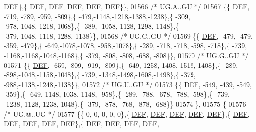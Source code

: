\begin{DoxyCode}
      \mbox{\hyperlink{1_88_84__epars_8h_a397419fc12b37ed479c8abb9d444d843}{DEF}}\},\{  \mbox{\hyperlink{1_88_84__epars_8h_a397419fc12b37ed479c8abb9d444d843}{DEF}},  \mbox{\hyperlink{1_88_84__epars_8h_a397419fc12b37ed479c8abb9d444d843}{DEF}},  \mbox{\hyperlink{1_88_84__epars_8h_a397419fc12b37ed479c8abb9d444d843}{DEF}},  \mbox{\hyperlink{1_88_84__epars_8h_a397419fc12b37ed479c8abb9d444d843}{DEF}},  \mbox{\hyperlink{1_88_84__epars_8h_a397419fc12b37ed479c8abb9d444d843}{DEF}}\}\},
01566 \textcolor{comment}{/* UG.A..GU */}
01567 \{\{  \mbox{\hyperlink{1_88_84__epars_8h_a397419fc12b37ed479c8abb9d444d843}{DEF}}, -719, -789, -959, -809\},\{ -479,-1148,-1218,-1388,-1238\},\{ -309, -978,-1048,-1218,-1068\},\{ -389,
      -1058,-1128,-1298,-1148\},\{ -379,-1048,-1118,-1288,-1138\}\},
01568 \textcolor{comment}{/* UG.C..GU */}
01569 \{\{  \mbox{\hyperlink{1_88_84__epars_8h_a397419fc12b37ed479c8abb9d444d843}{DEF}}, -479, -479, -359, -479\},\{ -649,-1078,-1078, -958,-1078\},\{ -289, -718, -718, -598, -718\},\{ -739,
      -1168,-1168,-1048,-1168\},\{ -379, -808, -808, -688, -808\}\},
01570 \textcolor{comment}{/* UG.G..GU */}
01571 \{\{  \mbox{\hyperlink{1_88_84__epars_8h_a397419fc12b37ed479c8abb9d444d843}{DEF}}, -659, -809, -919, -809\},\{ -649,-1258,-1408,-1518,-1408\},\{ -289, -898,-1048,-1158,-1048\},\{ -739,
      -1348,-1498,-1608,-1498\},\{ -379, -988,-1138,-1248,-1138\}\},
01572 \textcolor{comment}{/* UG.U..GU */}
01573 \{\{  \mbox{\hyperlink{1_88_84__epars_8h_a397419fc12b37ed479c8abb9d444d843}{DEF}}, -549, -439, -549, -359\},\{ -649,-1148,-1038,-1148, -958\},\{ -289, -788, -678, -788, -598\},\{ -739,
      -1238,-1128,-1238,-1048\},\{ -379, -878, -768, -878, -688\}\}
01574 \},
01575 \{
01576 \textcolor{comment}{/* UG.@..UG */}
01577 \{\{    0,    0,    0,    0,    0\},\{  \mbox{\hyperlink{1_88_84__epars_8h_a397419fc12b37ed479c8abb9d444d843}{DEF}},  \mbox{\hyperlink{1_88_84__epars_8h_a397419fc12b37ed479c8abb9d444d843}{DEF}},  \mbox{\hyperlink{1_88_84__epars_8h_a397419fc12b37ed479c8abb9d444d843}{DEF}},  \mbox{\hyperlink{1_88_84__epars_8h_a397419fc12b37ed479c8abb9d444d843}{DEF}},  \mbox{\hyperlink{1_88_84__epars_8h_a397419fc12b37ed479c8abb9d444d843}{DEF}}\},\{  
      \mbox{\hyperlink{1_88_84__epars_8h_a397419fc12b37ed479c8abb9d444d843}{DEF}},  \mbox{\hyperlink{1_88_84__epars_8h_a397419fc12b37ed479c8abb9d444d843}{DEF}},  \mbox{\hyperlink{1_88_84__epars_8h_a397419fc12b37ed479c8abb9d444d843}{DEF}},  \mbox{\hyperlink{1_88_84__epars_8h_a397419fc12b37ed479c8abb9d444d843}{DEF}},  \mbox{\hyperlink{1_88_84__epars_8h_a397419fc12b37ed479c8abb9d444d843}{DEF}}\},\{  \mbox{\hyperlink{1_88_84__epars_8h_a397419fc12b37ed479c8abb9d444d843}{DEF}},  \mbox{\hyperlink{1_88_84__epars_8h_a397419fc12b37ed479c8abb9d444d843}{DEF}},  \mbox{\hyperlink{1_88_84__epars_8h_a397419fc12b37ed479c8abb9d444d843}{DEF}},  \mbox{\hyperlink{1_88_84__epars_8h_a397419fc12b37ed479c8abb9d444d843}{DEF}},  

\end{DoxyCode}
